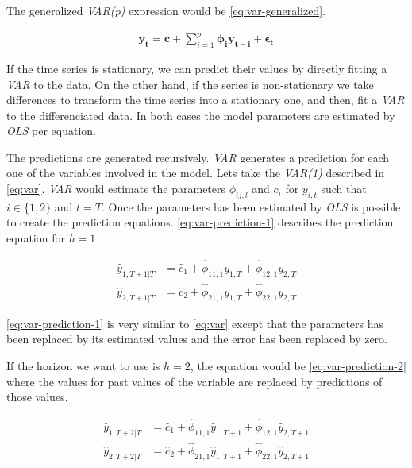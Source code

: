 The generalized \textit{VAR(p)} expression would be
\autoref{eq:var-generalized}.

\begin{equation}
  \begin{aligned}
    \label{eq:var-generalized}
    \mathbf{y_t} = \mathbf{c} + \displaystyle\sum_{i=1}^p
    \pmb{\phi_i} \mathbf{y_{t-i}} + \pmb{\epsilon_t}
  \end{aligned}
\end{equation}

If the time series is stationary, we can predict their values by
directly fitting a \textit{VAR} to the data. On the other hand, if the
series is non-stationary we take differences to transform the time
series into a stationary one, and then, fit a \textit{VAR} to the
differenciated data. In both cases the model parameters are estimated
by \textit{OLS} per equation.

The predictions are generated recursively. \textit{VAR} generates a
prediction for each one of the variables involved in the model. Lets
take the \textit{VAR(1)} described in \autoref{eq:var}. \textit{VAR}
would estimate the parameters $\phi_{ij,l}$ and $c_i$ for $y_{i,t}$
such that $i \in \{1,2\}$ and $t = T$. Once the parameters has been
estimated by \textit{OLS} is possible to create the prediction
equations. \autoref{eq:var-prediction-1} describes the prediction
equation for $h=1$

\begin{equation}
  \begin{aligned}
    \label{eq:var-prediction-1}
    \hat{y}_{1,T+1|T} & = \hat{c}_1 + \hat{\phi}_{11,1} y_{1,T} +
    \hat{\phi}_{12,1} y_{2,T} \\ 
    \hat{y}_{2,T+1|T} & = \hat{c}_2 + \hat{\phi}_{21,1} y_{1,T} +
    \hat{\phi}_{22,1} y_{2,T}
  \end{aligned}
\end{equation}

\autoref{eq:var-prediction-1} is very similar to \autoref{eq:var}
except that the parameters has been replaced by its estimated values
and the error has been replaced by zero.

If the horizon we want to use is $h = 2$, the equation would be
\autoref{eq:var-prediction-2} where the values for past values of the
variable are replaced by predictions of those values.

\begin{equation}
  \begin{aligned}
    \label{eq:var-prediction-2}
    \hat{y}_{1,T+2|T} & = \hat{c}_1 + \hat{\phi}_{11,1} \hat{y}_{1,T+1} +
    \hat{\phi}_{12,1} \hat{y}_{2,T+1} \\ 
    \hat{y}_{2,T+2|T} & = \hat{c}_2 + \hat{\phi}_{21,1} \hat{y}_{1,T+1} +
    \hat{\phi}_{22,1} \hat{y}_{2,T+1}
  \end{aligned}
\end{equation}
